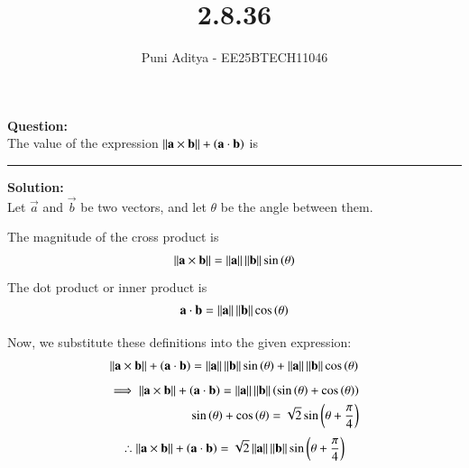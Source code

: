 \documentclass[journal]{IEEEtran}
\begin{document}
\title{2.8.36}
\author{Puni Aditya - EE25BTECH11046}
\maketitle

\textbf{Question:}\\
The value of the expression $\left\lVert\mathbf{a} \times \mathbf{b}\right\rVert + \left(\mathbf{a} \cdot \mathbf{b}\right)$ is \rule{2cm}{0.4pt}

\textbf{Solution:}\\
Let $\vec{a}$ and $\vec{b}$ be two vectors, and let $\theta$ be the angle between them.

The magnitude of the cross product is
\begin{align}
    \left\lVert\mathbf{a} \times \mathbf{b}\right\rVert = \left\lVert\mathbf{a}\right\rVert \left\lVert\mathbf{b}\right\rVert \sin\left(\theta\right)
\end{align}
The dot product or inner product is
\begin{align}
    \mathbf{a} \cdot \mathbf{b} = \left\lVert\mathbf{a}\right\rVert \left\lVert\mathbf{b}\right\rVert \cos\left(\theta\right)
\end{align}

Now, we substitute these definitions into the given expression:
\begin{align}
    \left\lVert\mathbf{a} \times \mathbf{b}\right\rVert + \left(\mathbf{a} \cdot \mathbf{b}\right) = \left\lVert\mathbf{a}\right\rVert \left\lVert\mathbf{b}\right\rVert \sin\left(\theta\right) + \left\lVert\mathbf{a}\right\rVert \left\lVert\mathbf{b}\right\rVert \cos\left(\theta\right) \label{eq:1}
\end{align}
\begin{align}
\implies \left\lVert\mathbf{a} \times \mathbf{b}\right\rVert + \left(\mathbf{a} \cdot \mathbf{b}\right) = \left\lVert\mathbf{a}\right\rVert \left\lVert\mathbf{b}\right\rVert \left(\sin\left(\theta\right) + \cos\left(\theta\right)\right) \\
\sin\left(\theta\right) + \cos\left(\theta\right) = \sqrt{2}\sin\left(\theta + \frac{\pi}{4}\right)
\end{align}
\begin{align*}
\therefore \left\lVert\mathbf{a} \times \mathbf{b}\right\rVert + \left(\mathbf{a} \cdot \mathbf{b}\right) = \sqrt{2} \left\lVert\mathbf{a}\right\rVert \left\lVert\mathbf{b}\right\rVert \sin\left(\theta + \frac{\pi}{4}\right)
\end{align*}
\end{document}
